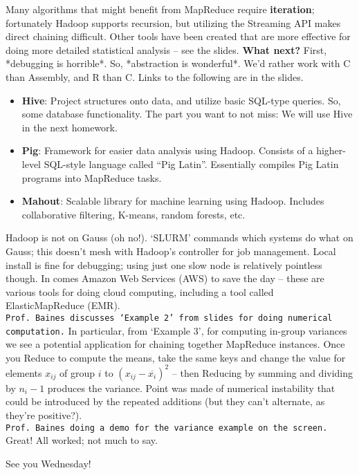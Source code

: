 \documentclass[12pt,letterpaper]{article}
\begin{document}
Many algorithms that might benefit from MapReduce require \textbf{iteration}; fortunately Hadoop supports recursion, but utilizing the Streaming API makes direct chaining difficult. Other tools have been created that are more effective for doing more detailed statistical analysis -- see the slides. \textbf{What next?} First, *debugging is horrible*. So, *abstraction is wonderful*. We'd rather work with C than Assembly, and R than C. Links to the following are in the slides.
\begin{itemize}
\item \textbf{Hive}: Project structures onto data, and utilize basic SQL-type queries. So, some database functionality. The part you want to not miss: {\large We will use Hive in the next homework}.

\item \textbf{Pig}: Framework for easier data analysis using Hadoop. Consists of a higher-level SQL-style language called ``Pig Latin''. Essentially compiles Pig Latin programs into MapReduce tasks.

\item \textbf{Mahout}: Scalable library for machine learning using Hadoop. Includes collaborative filtering, K-means, random forests, etc.
\end{itemize}

Hadoop is not on Gauss (oh no!). `SLURM' commands which systems do what on Gauss; this doesn't mesh with Hadoop's controller for job management. Local install is fine for debugging; using just one slow node is relatively pointless though. In comes Amazon Web Services (AWS) to save the day -- these are various tools for doing cloud computing, including a tool called ElasticMapReduce (EMR). \\

\texttt{Prof. Baines discusses `Example 2' from slides for doing numerical computation.} In particular, from `Example 3', for computing in-group variances we see a potential application for chaining together MapReduce instances. Once you Reduce to compute the means, take the same keys and change the value for elements $x_{ij}$ of group $i$ to $(x_{ij} - \overline{x_i})^2$ -- then Reducing by summing and dividing by $n_i-1$ produces the variance. Point was made of numerical instability that could be introduced by the repeated additions (but they can't alternate, as they're positive?).\\

\texttt{Prof. Baines doing a demo for the variance example on the screen.} Great! All worked; not much to say.

See you Wednesday!
\end{document}

